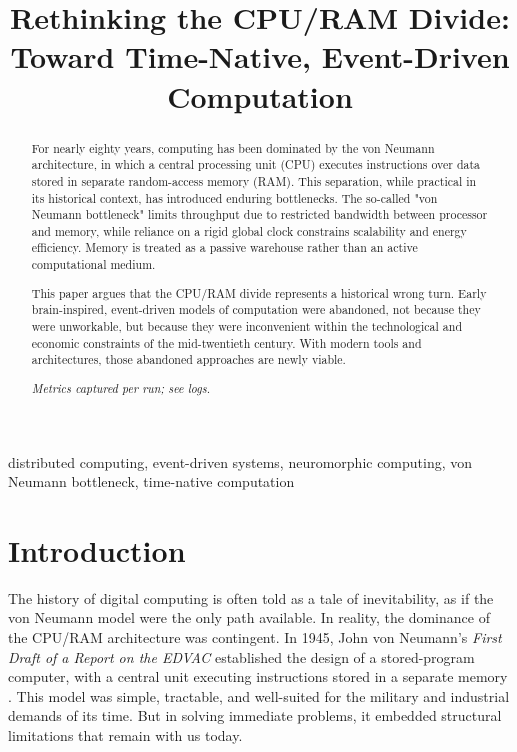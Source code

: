 \documentclass[conference]{IEEEtran}
\begin{document}
\title{Rethinking the CPU/RAM Divide: Toward Time-Native, Event-Driven Computation}

\author{
}

\maketitle

\begin{abstract}
For nearly eighty years, computing has been dominated by the von Neumann architecture, in which a central processing unit (CPU) executes instructions over data stored in separate random-access memory (RAM). This separation, while practical in its historical context, has introduced enduring bottlenecks. The so-called "von Neumann bottleneck" limits throughput due to restricted bandwidth between processor and memory, while reliance on a rigid global clock constrains scalability and energy efficiency. Memory is treated as a passive warehouse rather than an active computational medium.

This paper argues that the CPU/RAM divide represents a historical wrong turn. Early brain-inspired, event-driven models of computation were abandoned, not because they were unworkable, but because they were inconvenient within the technological and economic constraints of the mid-twentieth century. With modern tools and architectures, those abandoned approaches are newly viable.

\textit{Metrics captured per run; see logs.}\n\end{abstract}

\begin{IEEEkeywords}
distributed computing, event-driven systems, neuromorphic computing, von Neumann bottleneck, time-native computation
\end{IEEEkeywords}

\section{Introduction}

The history of digital computing is often told as a tale of inevitability, as if the von Neumann model were the only path available. In reality, the dominance of the CPU/RAM architecture was contingent. In 1945, John von Neumann's \textit{First Draft of a Report on the EDVAC} established the design of a stored-program computer, with a central unit executing instructions stored in a separate memory \cite{vonneumann1945}. This model was simple, tractable, and well-suited for the military and industrial demands of its time. But in solving immediate problems, it embedded structural limitations that remain with us today.
\end{document}
